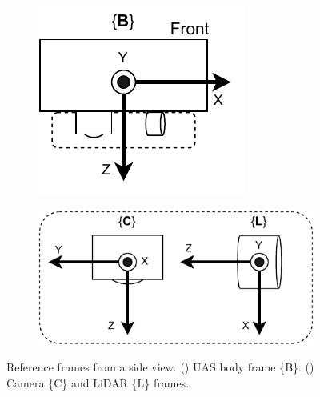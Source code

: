 \begin{figure}[ht]
 \centering
  \begin{subfigure}{.29\columnwidth}
    \centering\includegraphics[clip,trim=0cm 0.30cm 0.25cm 0cm, width=.99\columnwidth]{chapter_6_landingsim/figs/Frames-FramesA.pdf}
    \caption{\label{fig:ch6_frames_a}}
  \end{subfigure}
  \begin{subfigure}{.50\columnwidth}
    \centering\includegraphics[page=1, width=.99\columnwidth]{chapter_6_landingsim/figs/Frames-FramesB-v2.pdf}
    \caption{\label{fig:ch6_frames_b}}
  \end{subfigure}
  \caption[Coordinate frames for sensor package]{Reference frames from a side view. () UAS body frame \{B\}. () Camera \{C\} and LiDAR  \{L\} frames.}\label{fig:ch6_frames}
\end{figure}


